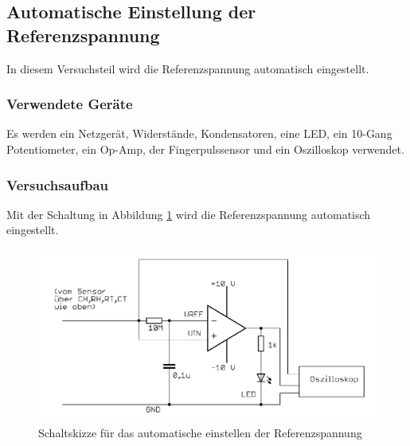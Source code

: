 \documentclass[12pt,a4paper]{article}
\begin{document}
\subsection{Automatische Einstellung der Referenzspannung}

In diesem Versuchsteil wird die Referenzspannung automatisch eingestellt.

\subsubsection*{Verwendete Geräte}

Es werden ein Netzgerät, Widerstände, Kondensatoren, eine LED, ein 10-Gang Potentiometer, ein Op-Amp, der Fingerpulssensor und ein Oszilloskop verwendet.

\subsubsection*{Versuchsaufbau}

Mit der Schaltung in Abbildung \ref{fig:auf_5} wird die Referenzspannung automatisch eingestellt.

\begin{figure}[H] 
	\centering
	\includegraphics[scale = 0.3]{auf_5.png}
	\caption[Schaltskizze für das automatische einstellen der Referenzspannung]{Schaltskizze für das automatische einstellen der Referenzspannung\footnotemark}
	\label{fig:auf_5}
\end{figure}
\end{document}
